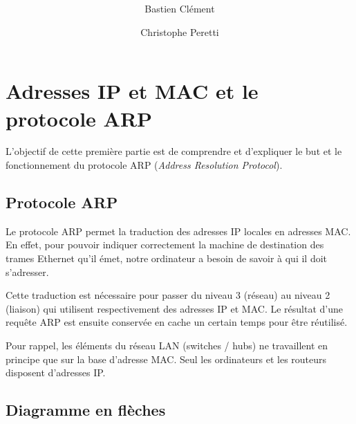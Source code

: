\documentclass[11pt,a4paper]{article}
\author{Bastien Clément \and Christophe Peretti}
\title{{\normalsize \doccourse} \\ \doctitle }
\begin{document}
\maketitle
\vspace{1em}

\section{Adresses IP et MAC et le protocole ARP}

L'objectif de cette première partie est de comprendre et d'expliquer le but et le fonctionnement du protocole ARP (\textit{Address Resolution Protocol}).

\subsection{Protocole ARP}

Le protocole ARP permet la traduction des adresses IP locales en adresses MAC. En effet, pour pouvoir indiquer correctement la machine de destination des trames Ethernet qu'il émet, notre ordinateur a besoin de savoir à qui il doit s'adresser.

Cette traduction est nécessaire pour passer du niveau 3 (réseau) au niveau 2 (liaison) qui utilisent respectivement des adresses IP et MAC. Le résultat d'une requête ARP est ensuite conservée en cache un certain temps pour être réutilisé.

Pour rappel, les éléments du réseau LAN (switches / hubs) ne travaillent en principe que sur la base d'adresse MAC. Seul les ordinateurs et les routeurs disposent d'adresses IP.

\subsection{Diagramme en flèches}

\begin{center}
\end{center}
\end{document}
